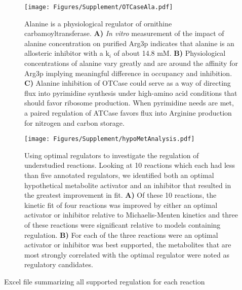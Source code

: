 \documentclass[12pt]{article}\usepackage{graphicx, color}
\begin{document}
\begin{figure}[h!]
\texttt{[image: Figures/Supplement/OTCaseAla.pdf]}
\caption{Alanine is a physiological regulator of ornithine carbamoyltransferase.  \textbf{A)} \textit{In vitro} measurement of the impact of alanine concentration on purified Arg3p indicates that alanine is an allosteric inhibitor with a k$_{i}$ of about 14.8 mM.  \textbf{B)} Physiological concentrations of alanine vary greatly and are around the affinity for Arg3p implying meaningful difference in occupancy and inhibition.  \textbf{C)} Alanine inhibition of OTCase could serve as a way of directing flux into pyrimidine synthesis under high-amino acid conditions that should favor ribosome production.  When pyrimidine needs are met, a paired regulation of ATCase favors flux into Arginine production for nitrogen and carbon storage.}
\label{fig:otcase}
\end{figure}


\begin{figure}[h!]
\texttt{[image: Figures/Supplement/hypoMetAnalysis.pdf]}
\caption{Using optimal regulators to investigate the regulation of understudied reactions.  Looking at 10 reactions which each had less than five annotated regulators, we identified both an optimal hypothetical metabolite activator and an inhibitor that resulted in the greatest improvement in fit.  \textbf{A)} Of these 10 reactions, the kinetic fit of four reactions was improved by either an optimal activator or inhibitor relative to Michaelis-Menten kinetics and three of these reactions were significant relative to models containing regulation.  \textbf{B)} For each of the three reactions were an optimal activator or inhibitor was best supported, the metabolites that are most strongly correlated with the optimal regulator were noted as regulatory candidates.}
\label{fig:hypoMet}
\end{figure}

\begin{table}[H!]
Excel file summarizing all supported regulation for each reaction
\caption{}
\label{tab:all_rxn}
\end{table}
\end{document}
